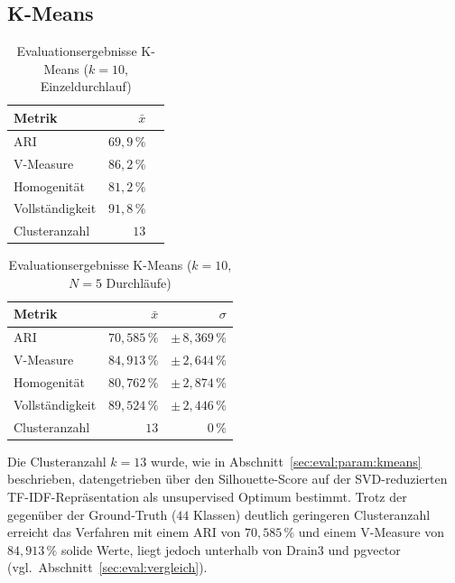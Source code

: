 \subsection{K-Means}
\label{sec:eval:kmeans}


\begin{table}[h]
    \centering
    \caption{Evaluationsergebnisse K-Means ($k = 10$, Einzeldurchlauf)}
    \label{tab:eval:kmeans}
    \begin{tabular}{lrr}
        \toprule
        Metrik & $\bar{x}$ \\
        \midrule
        ARI            & $69{,}9\,\%$ \\
        V-Measure      & $86{,}2\,\%$ \\
        Homogenität    & $81{,}2\,\%$ \\
        Vollständigkeit& $91{,}8\,\%$ \\
        \midrule
        Clusteranzahl  & $13$ \\
        \bottomrule
    \end{tabular}
\end{table}

\begin{table}[h]
    \centering
    \caption{Evaluationsergebnisse K-Means ($k = 10$, $N = 5$ Durchläufe)}
    \label{tab:eval:kmeans}
    \begin{tabular}{lrr}
        \toprule
        Metrik & $\bar{x}$ & $\sigma$  \\
        \midrule
        ARI            & $70{,}585\,\%$ & $\pm\,8{,}369\,\%$ \\
        V-Measure      & $84{,}913\,\%$ & $\pm\,2{,}644\,\%$ \\
        Homogenität    & $80{,}762\,\%$ & $\pm\,2{,}874\,\%$ \\
        Vollständigkeit& $89{,}524\,\%$ & $\pm\,2{,}446\,\%$ \\
        \midrule
        Clusteranzahl  & $13$ & $0\,\%$ \\
        \bottomrule
    \end{tabular}
\end{table}


Die Clusteranzahl $k = 13$ wurde, wie in Abschnitt~\ref{sec:eval:param:kmeans}
beschrieben, datengetrieben über den Silhouette-Score auf der
SVD-reduzierten TF-IDF-Repräsentation als unsupervised Optimum bestimmt.
Trotz der gegenüber der Ground-Truth
($44$ Klassen) deutlich geringeren Clusteranzahl erreicht das Verfahren mit
einem ARI von $70{,}585\,\%$ und einem V-Measure von $84{,}913\,\%$ solide
Werte, liegt jedoch unterhalb von Drain3 und pgvector
(vgl.\ Abschnitt~\ref{sec:eval:vergleich}).

